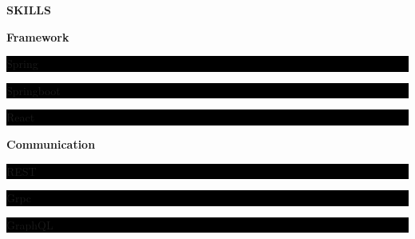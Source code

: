 \documentclass[10pt, a4paper]{article}
\begin{document}
    \vspace*{0.5in}
    {\large {} \enspace \textbf{SKILLS}} \par
    {\textbf{Framework}} \par
    {\color{white}\colorbox{black}{\strut Spring} \color{white}\colorbox{black}{\strut Springboot} \color{white}\colorbox{black}{\strut React}} \par
    \vspace*{0.1in}
    {\textbf{Communication}} \par
    {\color{white}\colorbox{black}{\strut REST} \color{white}\colorbox{black}{\strut Grpc} \color{white}\colorbox{black}{\strut GraphQL}} \par
\end{document}
